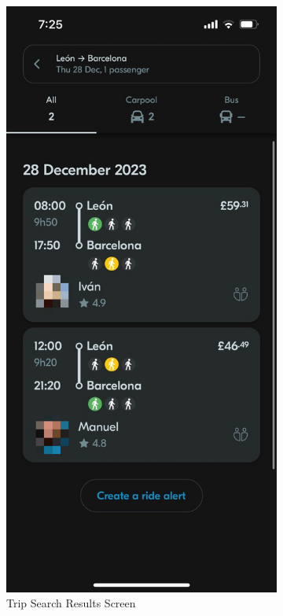 \documentclass[a4paper, 12pt]{report} %
\begin{document}
\begin{figure}
\begin{subfigure}{0.3\textwidth}
                        \includegraphics[width=0.8\linewidth, height=0.9\textheight, keepaspectratio]{Images/Blablacar_search_result.png}
                        \caption{Trip Search Results Screen}
                        \label{fig:blabla_results}
                    \end{subfigure}
                    \begin{subfigure}{0.3\textwidth}

\end{subfigure}
\end{figure}
\end{document}
